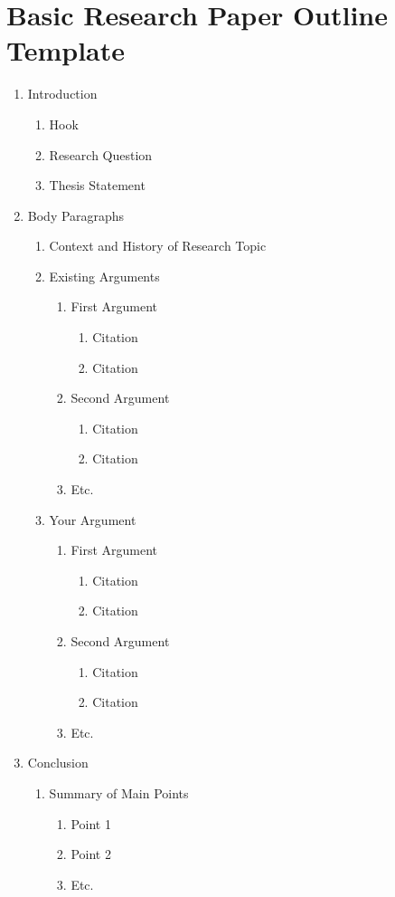 \documentclass[letterpaper, 12pt]{article}
\begin{document}
\section*{Basic Research Paper Outline Template}
\begin{enumerate}
  \item Introduction
  \begin{enumerate}
    \item Hook
    \item Research Question
    \item Thesis Statement
  \end{enumerate}
  \item Body Paragraphs
  \begin{enumerate}
    \item Context and History of Research Topic
    \item Existing Arguments
    \begin{enumerate}
      \item First Argument
      \begin{enumerate}
        \item Citation
        \item Citation
      \end{enumerate}
      \item Second Argument
      \begin{enumerate}
        \item Citation
        \item Citation
      \end{enumerate}
      \item Etc.
    \end{enumerate}
    \item Your Argument
    \begin{enumerate}
      \item First Argument
      \begin{enumerate}
        \item Citation
        \item Citation
      \end{enumerate}
      \item Second Argument
      \begin{enumerate}
        \item Citation
        \item Citation
      \end{enumerate}
      \item Etc.
    \end{enumerate}
  \end{enumerate}
  \item Conclusion
  \begin{enumerate}
    \item Summary of Main Points
    \begin{enumerate}
      \item Point 1
      \item Point 2
      \item Etc.
    \end{enumerate}
  \end{enumerate}
\end{enumerate}
\end{document}
